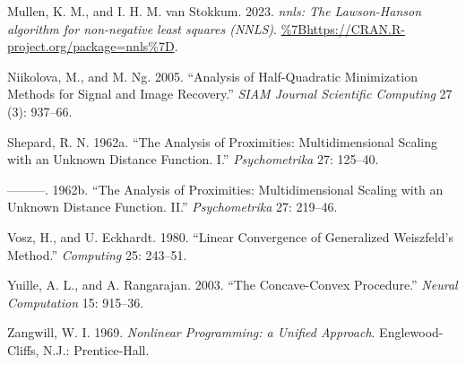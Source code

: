 \documentclass[
  12pt,
]{article}
\newlength{\cslhangindent}
\newenvironment{CSLReferences}[2] %
 {\begin{list}{}{%
  \setlength{\itemindent}{0pt}
  \setlength{\leftmargin}{0pt}
  \setlength{\parsep}{0pt}
  \ifodd #1
   \setlength{\leftmargin}{\cslhangindent}
   \setlength{\itemindent}{-1\cslhangindent}
  \fi
  \setlength{\itemsep}{#2\baselineskip}}}
 {\end{list}}
\begin{document}
\begin{CSLReferences}{1}{0}
Mullen, K. M., and I. H. M. van Stokkum. 2023. \emph{{nnls: The Lawson-Hanson algorithm for non-negative least squares (NNLS)}}. \url{\%7Bhttps://CRAN.R-project.org/package=nnls\%7D}.

Niikolova, M., and M. Ng. 2005. {``Analysis of Half-Quadratic Minimization Methods for Signal and Image Recovery.''} \emph{SIAM Journal Scientific Computing} 27 (3): 937--66.

Shepard, R. N. 1962a. {``{The Analysis of Proximities: Multidimensional Scaling with an Unknown Distance Function. I}.''} \emph{Psychometrika} 27: 125--40.

---------. 1962b. {``{The Analysis of Proximities: Multidimensional Scaling with an Unknown Distance Function. II}.''} \emph{Psychometrika} 27: 219--46.

Vosz, H., and U. Eckhardt. 1980. {``{Linear Convergence of Generalized {W}eiszfeld's Method}.''} \emph{Computing} 25: 243--51.

Yuille, A. L., and A. Rangarajan. 2003. {``{The Concave-Convex Procedure}.''} \emph{Neural Computation} 15: 915--36.

Zangwill, W. I. 1969. \emph{{Nonlinear Programming: a Unified Approach}}. Englewood-Cliffs, N.J.: Prentice-Hall.

\end{CSLReferences}
\end{document}
